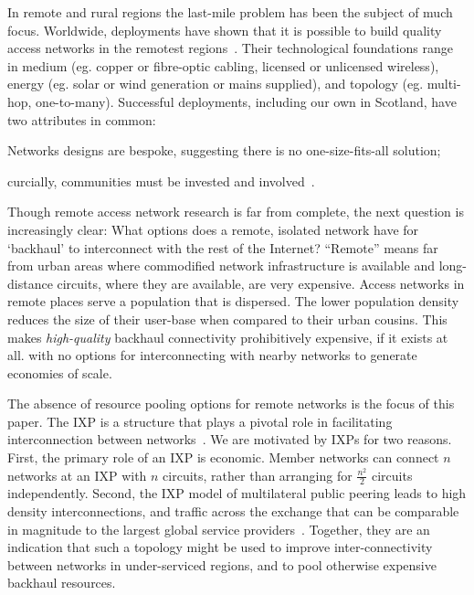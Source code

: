 In remote and rural regions the last-mile problem has been the subject of much
focus. Worldwide, deployments have shown that it is possible to build quality
access networks in the remotest regions~\cite{xxx}. Their technological
foundations range in medium (eg. copper or fibre-optic cabling, licensed
or unlicensed wireless), energy (eg. solar or wind generation or
mains supplied), and topology (eg. multi-hop,
one-to-many). Successful deployments, including our own in Scotland,
have two attributes in common:
\begin{inparaenum}[(i)]
  \item Networks designs are bespoke, suggesting
    there is no one-size-fits-all solution;
  \item curcially, communities must be invested and
    involved~\cite{Wallace:2015a,Wallace:2015b}.
\end{inparaenum}

Though remote access network research is far from complete, the next question
is increasingly clear: What options does a remote, isolated network have for
`backhaul' to interconnect with the rest of the Internet? ``Remote'' means far
from urban areas where commodified network infrastructure is available and
long-distance circuits, where they are available, are very expensive. Access
networks in remote places serve a population that is dispersed. The lower
population density reduces the size of their user-base when compared to their
urban cousins. This makes \emph{high-quality} backhaul connectivity
prohibitively expensive, if it exists at all. with no options for
interconnecting with nearby networks to generate economies of scale.


The absence of resource pooling options for remote networks is the focus of this
paper. The \acf{IXP} is a structure that plays a pivotal role in facilitating
interconnection between networks~\cite{Ager:2012}. We are motivated by
\acp{IXP} for two reasons. First, the primary role of an \ac{IXP} is economic.
Member networks can connect $n$ networks at an IXP with $n$ circuits, rather
than arranging for $\frac{n^2}{2}$ circuits independently. Second, the \ac{IXP}
model of multilateral public peering leads to high density interconnections, and
traffic across the exchange that can be comparable in magnitude to the largest
global service providers~\cite{Ager:2012}. Together, they are an indication that
such a topology might be used to improve inter-connectivity between networks in
under-serviced regions, and to pool otherwise expensive backhaul resources.

